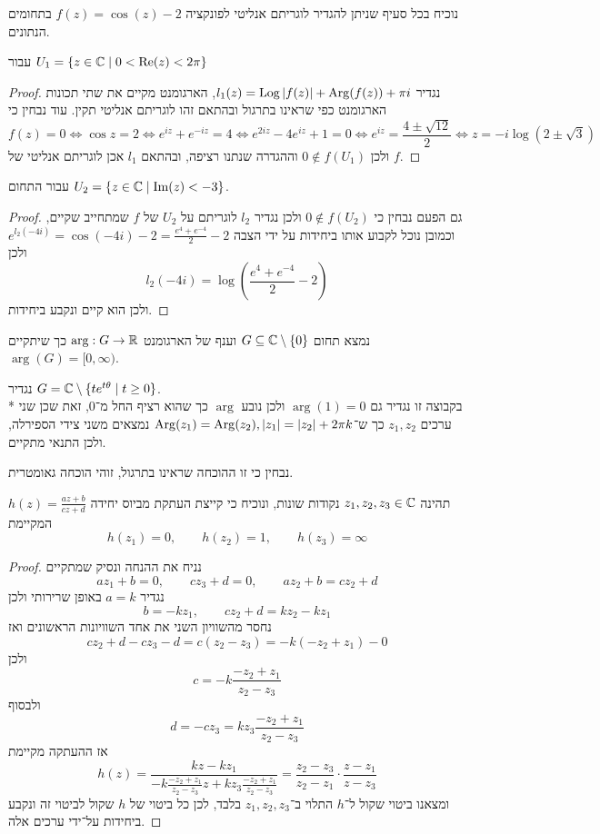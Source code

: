\Question{}
נוכיח בכל סעיף שניתן להגדיר לוגריתם אנליטי לפונקציה $f(z) = \cos(z) - 2$ בתחומים הנתונים.

\Subquestion{}
עבור $U_1 = \{ z \in \mathbb{C} \mid 0 < \operatorname{Re}(z) < 2\pi \}$
\begin{proof}
	נגדיר $l_1(z) = \operatorname{Log}|f(z)| + \operatorname{Arg}(f(z)) + \pi i$, הארגומנט מקיים את שתי תכונות הארגומנט כפי שראינו בתרגול ובהתאם זהו לוגריתם אנליטי תקין.
	עוד נבחין כי
	\[
		f(z) = 0 \iff \cos z = 2 \iff e^{iz} + e^{-iz} = 4 \iff e^{2 iz} - 4 e^{iz} + 1 = 0 \iff e^{iz} = \frac{4 \pm \sqrt{12}}{2} \iff z = -i \log(2 \pm \sqrt{3})
	\]
	ולכן $0 \notin f(U_1)$ וההגדרה שנתנו רציפה, ובהתאם $l_1$ אכן לוגריתם אנליטי של $f$.
\end{proof}

\Subquestion{}
עבור התחום $U_2 = \{ z \in \mathbb{C} \mid \operatorname{Im}(z) < -3 \}$.
\begin{proof}
	גם הפעם נבחין כי $0 \notin f(U_2)$ ולכן נגדיר $l_2$ לוגריתם על $U_2$ של $f$ שמתחייב שקיים, וכמובן נוכל לקבוע אותו ביחידות על ידי הצבה $e^{l_2(-4i)} = \cos(-4i) - 2 = \frac{e^4 + e^{-4}}{2} - 2$ ולכן
	\[
		l_2(-4i) = \log(\frac{e^4 + e^{-4}}{2} - 2)
	\]
	ולכן הוא קיים ונקבע ביחידות.
\end{proof}

\Question{}
נמצא תחום $G \subseteq \mathbb{C} \setminus \{ 0 \}$ וענף של הארגומנט $\arg : G \to \mathbb{R}$ כך שיתקיים $\arg(G) = [0, \infty)$. %
\begin{solution}
	נגדיר $G = \mathbb{C} \setminus \{ t e^{t \theta} \mid t \ge 0 \}$. \\*
	בקבוצה זו נגדיר גם $\arg(1) = 0$ ולכן נובע $\arg$ כך שהוא רציף החל מ־$0$, זאת שכן שני ערכים $z_1, z_2$ כך ש־$\operatorname{Arg}(z_1) = \operatorname{Arg}(z_2), |z_1| = |z_2| + 2\pi k$ נמצאים משני צידי הספירלה, ולכן התנאי מתקיים.

	נבחין כי זו ההוכחה שראינו בתרגול, זוהי הוכחה גאומטרית.
\end{solution}

\Question{}
\Subquestion{}
תהינה $z_1, z_2, z_3 \in \mathbb{C}$ נקודות שונות, ונוכיח כי קייצת העתקת מביוס יחידה $h(z) = \frac{az + b}{cz + d}$ המקיימת
\[
	h(z_1) = 0,
	\qquad
	h(z_2) = 1,
	\qquad
	h(z_3) = \infty
\]
\begin{proof}
	נניח את ההנחה ונסיק שמתקיים
	\[
		a z_1 + b = 0,
		\qquad
		c z_3 + d = 0,
		\qquad
		a z_2 + b = c z_2 + d
	\]
	נגדיר $a = k$ באופן שרירותי ולכן
	\[
		b = - k z_1,
		\qquad
		c z_2 + d = k z_2 - k z_1
	\]
	נחסר מהשוויון השני את אחד השוויונות הראשונים ואז
	\[
		c z_2 + d - c z_3 - d = c(z_2 - z_3) = -k (-z_2 + z_1) - 0
	\]
	ולכן
	\[
		c = -k \frac{-z_2 + z_1}{z_2 - z_3}
	\]
	ולבסוף
	\[
		d = -c z_3 = k z_3 \frac{-z_2 + z_1}{z_2 - z_3}
	\]
	אז ההעתקה מקיימת
	\[
		h(z)
		= \frac{k z - k z_1}{-k \frac{-z_2 + z_1}{z_2 - z_3} z + k z_3 \frac{-z_2 + z_1}{z_2 - z_3}}
		= \frac{z_2 - z_3}{z_2 - z_1} \cdot \frac{z - z_1}{z - z_3}
	\]
	ומצאנו ביטוי שקול ל־$h$ התלוי ב־$z_1, z_2, z_3$ בלבד, לכן כל ביטוי של $h$ שקול לביטוי זה ונקבע ביחידות על־ידי ערכים אלה.
\end{proof}

